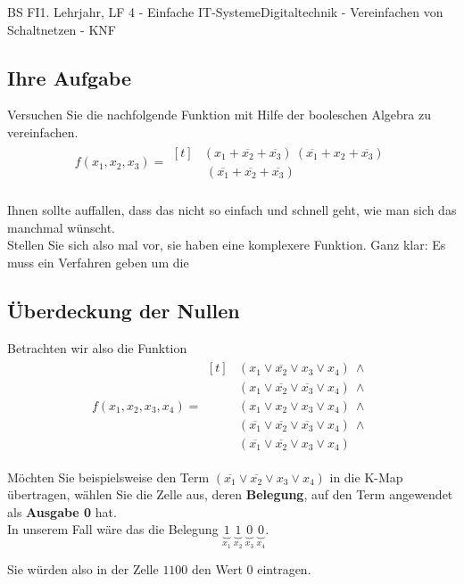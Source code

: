 \documentclass[11pt,twocolumn,oneside,openany,headings=optiontotoc,11pt,numbers=noenddot]{article}
\begin{document}
\begin{worksheet}{BS FI}{1. Lehrjahr, LF 4 - Einfache IT-Systeme}{Digitaltechnik - Vereinfachen von Schaltnetzen - KNF}
		\subsection*{Ihre Aufgabe} Versuchen Sie die nachfolgende Funktion mit Hilfe der booleschen Algebra zu vereinfachen.
		\begin{align*}
			f(x_1,x_2,x_3) = 
			\!\begin{aligned}[t]
				& (x_1+ \overline{x_2} + \overline{x_3}) \  (\overline{x_1} + x_2 + \overline{x_3}) \\
				& \  (\overline{x_1} + \overline{x_2} + \overline{x_3})
			\end{aligned}
		\end{align*}\\
		Ihnen sollte auffallen, dass das nicht so einfach und schnell geht, wie man sich das manchmal wünscht.\\
		Stellen Sie sich also mal vor, sie haben eine komplexere Funktion. Ganz klar: Es muss ein Verfahren geben um die 
		
		\subsection{Überdeckung der Nullen} Betrachten wir also die Funktion\\
		\begin{align*}
			f(x_1,x_2,x_3,x_4) = \!\begin{aligned}[t]
				& (x_1\lor \overline{x_2}\lor x_3\lor x_4)\ \land\\
				& (x_1\lor \overline{x_2}\lor \overline{x_3}\lor x_4)\ \land\\
				& (x_1\lor x_2\lor x_3\lor x_4 )\ \land\\
				& (\overline{x_1}\lor \overline{x_2}\lor \overline{x_3}\lor x_4)\ \land\\
				& (\overline{x_1}\lor \overline{x_2}\lor x_3\lor x_4)
			\end{aligned}
		\end{align*}
		\begin{framed}
			\noindent
			Möchten Sie beispielsweise den Term \((\overline{x_1}\lor \overline{x_2}\lor x_3\lor x_4)\) in die K-Map übertragen, wählen Sie die Zelle aus, deren \textbf{Belegung}, auf den Term angewendet als \textbf{Ausgabe 0} hat.\\
			In unserem Fall wäre das die Belegung \(\underbrace{1}_{x_1}\ \underbrace{1}_{x_2}\ \underbrace{0}_{x_3}\ \underbrace{0}_{x_4}\).\\
			\par\noindent
			Sie würden also in der Zelle \(1100\) den Wert \(0\) eintragen.
		\end{framed}

\end{worksheet}
\end{document}
